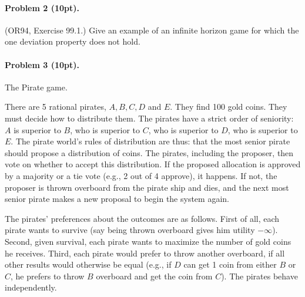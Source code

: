 \documentclass[12pt]{article}
\begin{document}
\paragraph{Problem 2 (10pt).} (OR94, Exercise 99.1.) Give an example of an infinite horizon game for which the one deviation property does not hold.

\paragraph{Problem 3 (10pt).} The Pirate game.

There are 5 rational pirates, $A, B, C, D$ and $E$. They find 100 gold coins. They must decide how to distribute them.
The pirates have a strict order of seniority: $A$ is superior to $B$, who is superior to $C$, who is superior to $D$, who is superior to $E$.
The pirate world's rules of distribution are thus: that the most senior pirate should propose a distribution of coins. The pirates, including the proposer, then vote on whether to accept this distribution. If the proposed allocation is approved by a majority or a tie vote (e.g., 2 out of 4 approve), it happens. If not, the proposer is thrown overboard from the pirate ship and dies, and the next most senior pirate makes a new proposal to begin the system again.

The pirates' preferences about the outcomes are as follows. First of all, each pirate wants to survive (say being thrown overboard gives him utility $-\infty$). Second, given survival, each pirate wants to maximize the number of gold coins he receives. Third, each pirate would prefer to throw another overboard, if all other results would otherwise be equal (e.g., if $D$ can get 1 coin from either $B$ or $C$, he prefers to throw $B$ overboard and get the coin from $C$).
The pirates behave independently.
\end{document}
